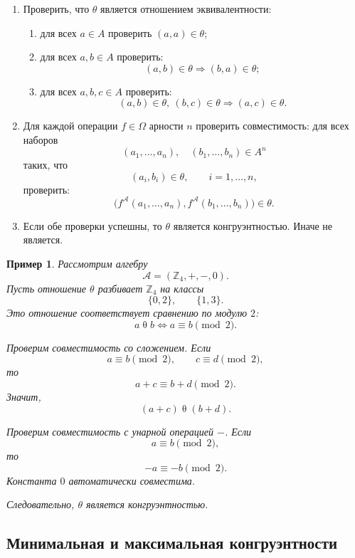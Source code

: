 \documentclass[12pt,a4paper]{article}
\newtheorem{example}{Пример}
\begin{document}
\begin{algorithm}
\caption{Проверка конгруэнтности}
\leavevmode
\begin{enumerate}
    \item Проверить, что $\theta$ является отношением эквивалентности:
    \begin{enumerate}
        \item для всех $a\in A$ проверить $(a,a)\in\theta$;
        \item для всех $a,b\in A$ проверить:
        \[
        (a,b)\in\theta\Rightarrow (b,a)\in\theta;
        \]
        \item для всех $a,b,c\in A$ проверить:
        \[
        (a,b)\in\theta,\ (b,c)\in\theta
        \Rightarrow
        (a,c)\in\theta.
        \]
    \end{enumerate}

    \item Для каждой операции $f\in\Omega$ арности $n$ проверить совместимость:
    для всех наборов
    \[
    (a_1,\dots,a_n),\quad (b_1,\dots,b_n)\in A^n
    \]
    таких, что
    \[
    (a_i,b_i)\in\theta,\qquad i=1,\dots,n,
    \]
    проверить:
    \[
    \bigl(
    f^{\mathcal A}(a_1,\dots,a_n),
    f^{\mathcal A}(b_1,\dots,b_n)
    \bigr)\in\theta.
    \]

    \item Если обе проверки успешны, то $\theta$ является конгруэнтностью. Иначе не является.
\end{enumerate}
\end{algorithm}

\begin{example}
Рассмотрим алгебру
\[
\mathcal A=(\mathbb Z_4,+,-,0).
\]
Пусть отношение $\theta$ разбивает $\mathbb Z_4$ на классы
\[
\{0,2\},\qquad \{1,3\}.
\]
Это отношение соответствует сравнению по модулю $2$:
\[
a\mathrel{\theta}b
\Longleftrightarrow
a\equiv b\pmod 2.
\]

Проверим совместимость со сложением. Если
\[
a\equiv b\pmod 2,
\qquad
c\equiv d\pmod 2,
\]
то
\[
a+c\equiv b+d\pmod 2.
\]
Значит,
\[
(a+c)\mathrel{\theta}(b+d).
\]

Проверим совместимость с унарной операцией $-$. Если
\[
a\equiv b\pmod 2,
\]
то
\[
-a\equiv -b\pmod 2.
\]
Константа $0$ автоматически совместима.

Следовательно, $\theta$ является конгруэнтностью.
\end{example}

\subsection{Минимальная и максимальная конгруэнтности}
\end{document}
